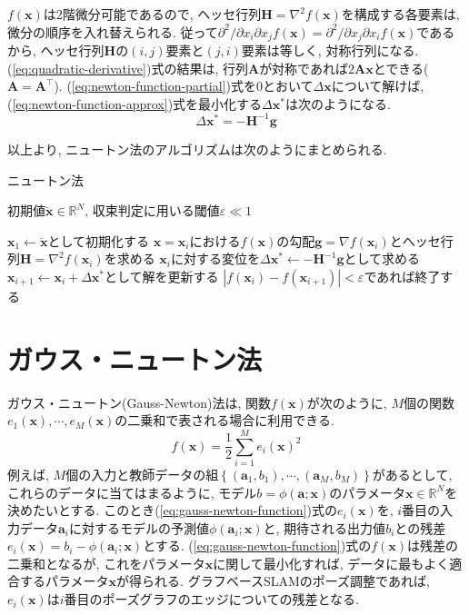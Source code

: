 \documentclass[dvipdfmx,a4paper]{jsarticle}
\begin{document}
$f(\bm{x})$は2階微分可能であるので, ヘッセ行列$\bm{H} = \nabla^2 f(\bm{x})$を構成する各要素は, 微分の順序を入れ替えられる.
従って$\partial^2 / \partial x_i \partial x_j f(\bm{x}) = \partial^2 / \partial x_j \partial x_i f(\bm{x})$であるから, ヘッセ行列$\bm{H}$の$(i, j)$要素と$(j, i)$要素は等しく, 対称行列になる.
(\ref{eq:quadratic-derivative})式の結果は, 行列$\bm{A}$が対称であれば$2 \bm{A} \bm{x}$とできる($\bm{A} = \bm{A}^\top$).
(\ref{eq:newton-function-partial})式を$0$とおいて$\Delta \bm{x}$について解けば, (\ref{eq:newton-function-approx})式を最小化する$\Delta \bm{x}^*$は次のようになる.
\begin{equation} \label{eq:newton-update}
    \Delta \bm{x}^* = -\bm{H}^{-1} \bm{g}
\end{equation}

以上より, ニュートン法のアルゴリズムは次のようにまとめられる.

\begin{algorithm}[H]
    \caption{ニュートン法}
    \label{alg:newton}
    \begin{algorithmic}[1]
        \Require 初期値$\breve{\bm{x}} \in \mathbb{R}^N$, 収束判定に用いる閾値$\varepsilon \ll 1$

        \State $\bm{x}_1 \gets \breve{\bm{x}}$として初期化する
            \State $\bm{x} = \bm{x}_i$における$f(\bm{x})$の勾配$\bm{g} = \nabla f(\bm{x}_i)$とヘッセ行列$\bm{H} = \nabla^2 f(\bm{x}_i)$を求める
            \State $\bm{x}_i$に対する変位を$\Delta \bm{x}^* \gets -\bm{H}^{-1} \bm{g}$として求める
            \State $\bm{x}_{i + 1} \gets \bm{x}_i + \Delta \bm{x}^*$として解を更新する
            \State $\left| f(\bm{x}_i) - f(\bm{x}_{i + 1}) \right| < \varepsilon$であれば終了する
        \EndFor
    \end{algorithmic}
\end{algorithm}

\section{ガウス・ニュートン法}
ガウス・ニュートン(Gauss-Newton)法は, 関数$f(\bm{x})$が次のように, $M$個の関数$e_1(\bm{x}), \cdots, e_M(\bm{x})$の二乗和で表される場合に利用できる.
\begin{equation} \label{eq:gauss-newton-function}
    f(\bm{x}) = \frac{1}{2} \sum_{i = 1}^M e_i(\bm{x})^2
\end{equation}
例えば, $M$個の入力と教師データの組$\left\{ (\bm{a}_1, b_1), \cdots, (\bm{a}_M, b_M) \right\}$があるとして, これらのデータに当てはまるように, モデル$b = \phi(\bm{a}; \bm{x})$のパラメータ$\bm{x} \in \mathbb{R}^N$を決めたいとする.
このとき(\ref{eq:gauss-newton-function})式の$e_i(\bm{x})$を, $i$番目の入力データ$\bm{a}_i$に対するモデルの予測値$\phi(\bm{a}_i; \bm{x})$と, 期待される出力値$b_i$との残差$e_i(\bm{x}) = b_i - \phi(\bm{a}_i; \bm{x})$とする.
(\ref{eq:gauss-newton-function})式の$f(\bm{x})$は残差の二乗和となるが, これをパラメータ$\bm{x}$に関して最小化すれば, データに最もよく適合するパラメータ$\bm{x}$が得られる.
グラフベースSLAMのポーズ調整であれば, $e_i(\bm{x})$は$i$番目のポーズグラフのエッジについての残差となる.
\end{document}
